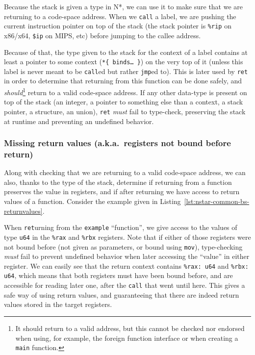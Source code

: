 Because the stack is given a type in N*, we can use it to make sure that we are returning to a code-space address.
When we \texttt{call} a label, we are pushing the current instruction pointer on top of the stack (the stack pointer is \texttt{\%rip} on x86/x64, \texttt{\$ip} on MIPS, etc) before jumping to the callee address.

Because of that, the type given to the stack for the context of a label contains at least a pointer to some context (\texttt{*\{ binds\ldots\ \}}) on the very top of it (unless this label is never meant to be \texttt{call}ed but rather \texttt{jmp}ed to).
This is later used by \texttt{ret} in order to determine that returning from this function can be done safely, and \textit{should}\footnote{It should return to a valid address, but this cannot be checked nor endorsed when using, for example, the foreign function interface or when creating a \texttt{main} function.} return to a valid code-space address.
If any other data-type is present on top of the stack (an integer, a pointer to something else than a context, a stack pointer, a structure, an union), \texttt{ret} \textit{must} fail to type-check, preserving the stack at runtime and preventing an undefined behavior.

\subsubsection{Missing return values (a.k.a.\ registers not bound before return)}\label{subsubsec:nstar-common-bs-restrictions-unboundregs}

Along with checking that we are returning to a valid code-space address, we can also, thanks to the type of the stack, determine if returning from a function preserves the value in registers, and if after returning we have access to return values of a function.
Consider the example given in Listing~\ref{lst:nstar-common-bs-returnvalues}.

When \texttt{ret}urning from the \texttt{example} ``function'', we give access to the values of type \texttt{u64} in the \texttt{\%rax} and \texttt{\%rbx} registers.
Note that if either of those registers were not bound before (not given as parameters, or bound using \texttt{mov}), type-checking \textit{must} fail to prevent undefined behavior when later accessing the ``value'' in either register.
We can easily see that the return context contains \texttt{\%rax: u64} and \texttt{\%rbx: u64}, which means that both registers must have been bound before, and are accessible for reading later one, after the \texttt{call} that went until here.
This gives a safe way of using return values, and guaranteeing that there are indeed return values stored in the target registers.

